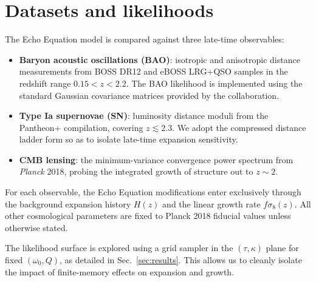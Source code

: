 \section{Datasets and likelihoods}
\label{sec:data}

The Echo Equation model is compared against three late-time observables:

\begin{itemize}
    \item \textbf{Baryon acoustic oscillations (BAO)}: isotropic and anisotropic distance measurements from BOSS DR12 and eBOSS LRG+QSO samples in the redshift range $0.15 < z < 2.2$. The BAO likelihood is implemented using the standard Gaussian covariance matrices provided by the collaboration.
    \item \textbf{Type Ia supernovae (SN)}: luminosity distance moduli from the Pantheon+ compilation, covering $z \lesssim 2.3$. We adopt the compressed distance ladder form so as to isolate late-time expansion sensitivity.
    \item \textbf{CMB lensing}: the minimum-variance convergence power spectrum from \textit{Planck} 2018, probing the integrated growth of structure out to $z \sim 2$.
\end{itemize}

For each observable, the Echo Equation modifications enter exclusively through the background expansion history $H(z)$ and the linear growth rate $f\sigma_8(z)$. All other cosmological parameters are fixed to Planck 2018 fiducial values unless otherwise stated.

The likelihood surface is explored using a grid sampler in the $(\tau, \kappa)$ plane for fixed $(\omega_0, Q)$, as detailed in Sec.~\ref{sec:results}. This allows us to cleanly isolate the impact of finite-memory effects on expansion and growth.
